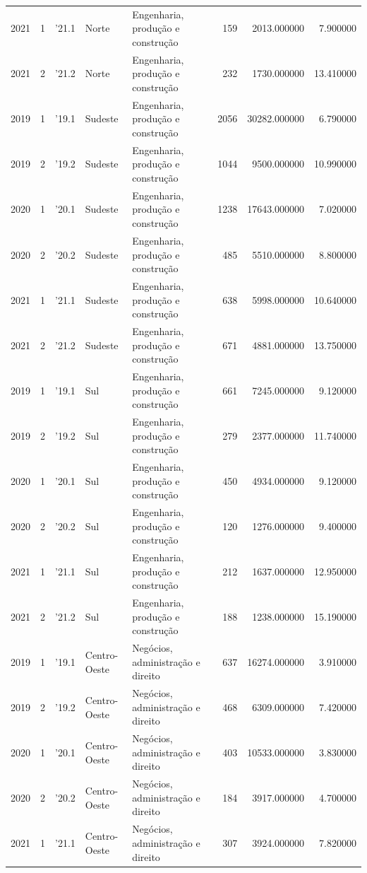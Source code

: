 \begin{longtable}{rrlllrrr}
2021 & 1 & '21.1 & Norte & Engenharia, produção e construção & 159 & 2013.000000 & 7.900000 \\
2021 & 2 & '21.2 & Norte & Engenharia, produção e construção & 232 & 1730.000000 & 13.410000 \\
2019 & 1 & '19.1 & Sudeste & Engenharia, produção e construção & 2056 & 30282.000000 & 6.790000 \\
2019 & 2 & '19.2 & Sudeste & Engenharia, produção e construção & 1044 & 9500.000000 & 10.990000 \\
2020 & 1 & '20.1 & Sudeste & Engenharia, produção e construção & 1238 & 17643.000000 & 7.020000 \\
2020 & 2 & '20.2 & Sudeste & Engenharia, produção e construção & 485 & 5510.000000 & 8.800000 \\
2021 & 1 & '21.1 & Sudeste & Engenharia, produção e construção & 638 & 5998.000000 & 10.640000 \\
2021 & 2 & '21.2 & Sudeste & Engenharia, produção e construção & 671 & 4881.000000 & 13.750000 \\
2019 & 1 & '19.1 & Sul & Engenharia, produção e construção & 661 & 7245.000000 & 9.120000 \\
2019 & 2 & '19.2 & Sul & Engenharia, produção e construção & 279 & 2377.000000 & 11.740000 \\
2020 & 1 & '20.1 & Sul & Engenharia, produção e construção & 450 & 4934.000000 & 9.120000 \\
2020 & 2 & '20.2 & Sul & Engenharia, produção e construção & 120 & 1276.000000 & 9.400000 \\
2021 & 1 & '21.1 & Sul & Engenharia, produção e construção & 212 & 1637.000000 & 12.950000 \\
2021 & 2 & '21.2 & Sul & Engenharia, produção e construção & 188 & 1238.000000 & 15.190000 \\
2019 & 1 & '19.1 & Centro-Oeste & Negócios, administração e direito & 637 & 16274.000000 & 3.910000 \\
2019 & 2 & '19.2 & Centro-Oeste & Negócios, administração e direito & 468 & 6309.000000 & 7.420000 \\
2020 & 1 & '20.1 & Centro-Oeste & Negócios, administração e direito & 403 & 10533.000000 & 3.830000 \\
2020 & 2 & '20.2 & Centro-Oeste & Negócios, administração e direito & 184 & 3917.000000 & 4.700000 \\
2021 & 1 & '21.1 & Centro-Oeste & Negócios, administração e direito & 307 & 3924.000000 & 7.820000 \\

\end{longtable}
